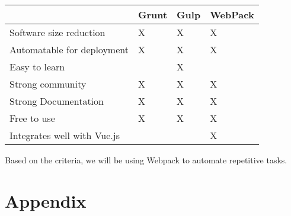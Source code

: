 \documentclass[draftclsnofoot,onecolumn,letterpaper,10pt,compsoc]{IEEEtran}
\begin{document}
		    \begin{center}
		            \begin{tabular}{| m{15em} | m{10em} | m{10em} | m{10em} |}
		                \hline
		                    & Grunt & Gulp & WebPack \\

		                \hline
		                    Software size reduction & X & X & X \\

		                \hline
		                    Automatable for deployment & X & X & X \\

		                \hline
		                    Easy to learn &  & X &  \\

		                \hline
		                    Strong community & X & X & X \\

		                \hline
		                    Strong Documentation & X & X & X \\

		                \hline
		                    Free to use & X & X & X \\

		                \hline
                        Integrates well with Vue.js &  &  & X \\

                    \hline
		            \end{tabular}
		        \end{center}

		        Based on the criteria, we will be using Webpack to automate repetitive tasks.

					\clearpage

\section{Appendix}
\end{document}
